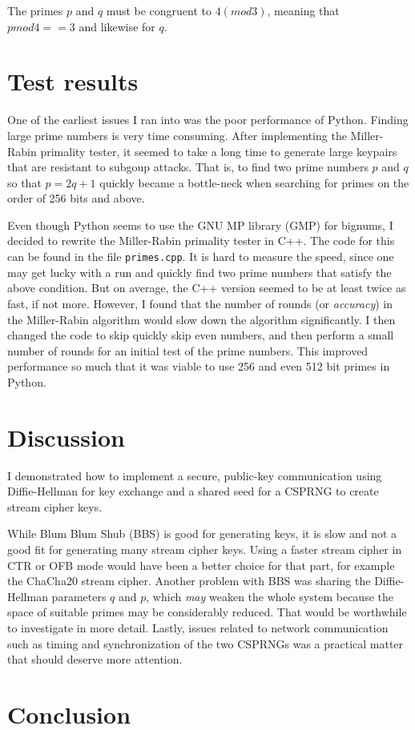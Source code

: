 \documentclass[a4paper,english,12pt]{article}
\begin{document}
The primes $p$ and $q$ must be congruent to $4 (mod 3)$, meaning that $p mod 4
== 3$ and likewise for $q$.

\section{Test results}
One of the earliest issues I ran into was the poor performance of Python.
Finding large prime numbers is very time consuming. After implementing the
Miller-Rabin primality tester, it seemed to take a long time to generate large
keypairs that are resistant to subgoup attacks. That is, to find two prime
numbers $p$ and $q$ so that $p = 2q+1$ quickly became a bottle-neck when
searching for primes on the order of 256 bits and above.

Even though Python seems to use the GNU MP library (GMP) for bignums, I decided
to rewrite the Miller-Rabin primality tester in C++. The code for this can be
found in the file \texttt{primes.cpp}. It is hard to measure the speed, since
one may get lucky with a run and quickly find two prime numbers that satisfy
the above condition. But on average, the C++ version seemed to be at least
twice as fast, if not more. However, I found that the number of rounds (or
\textit{accuracy}) in the Miller-Rabin algorithm would slow down the algorithm
significantly. I then changed the code to skip quickly skip even numbers, and
then perform a small number of rounds for an initial test of the prime numbers.
This improved performance so much that it was viable to use 256 and even 512
bit primes in Python.

\section{Discussion}
I demonstrated how to implement a secure, public-key communication using
Diffie-Hellman for key exchange and a shared seed for a CSPRNG to create stream
cipher keys.

While Blum Blum Shub (BBS) is good for generating keys, it is slow and not a good fit
for generating many stream cipher keys. Using a faster stream cipher in CTR or
OFB mode would have been a better choice for that part, for example the
ChaCha20 \cite{chacha20} stream cipher. Another problem with BBS was sharing
the Diffie-Hellman parameters $q$ and $p$, which \textit{may} weaken the whole
system because the space of suitable primes may be considerably reduced. That
would be worthwhile to investigate in more detail. Lastly, issues related to
network communication such as timing and synchronization of the two CSPRNGs was
a practical matter that should deserve more attention.

\section{Conclusion}



\end{document}
